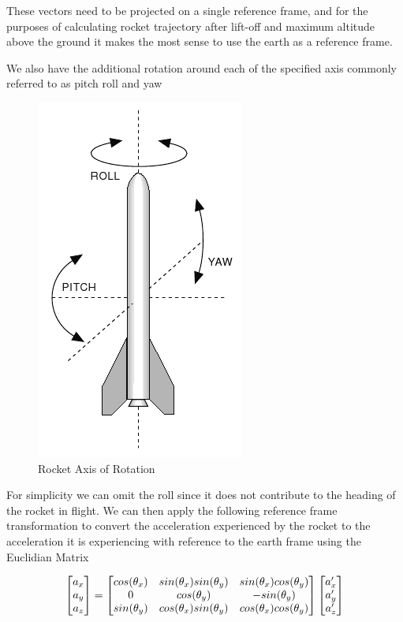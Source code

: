 \documentclass[conference, letterpaper]{IEEEtran}
\begin{document}
These vectors need to be projected on a single reference frame, and for the purposes of calculating
rocket trajectory after lift-off and maximum altitude above the ground it makes the most sense to
use the earth as a reference frame.

We also have the additional rotation around each of the specified axis commonly referred to as
pitch roll and yaw

\begin{figure}[H]
\centering
\includegraphics[scale=0.50]{./pitch_roll_yaw}
\caption{Rocket Axis of Rotation}
\label{fig:pitch_roll_yaw}
\end{figure}

For simplicity we can omit the roll since it does not contribute to the heading of the rocket in flight.
We can then apply the following reference frame transformation to convert the acceleration experienced
by the rocket to the acceleration it is experiencing with reference to the earth frame using the Euclidian Matrix
\cite{mallick_2016}
\vspace{5mm}

\begin{equation}\label{eq:2}
  \begin{bmatrix}a_x \\ a_y \\ a_z
  \end{bmatrix} =

  \vspace{5mm}
  \begin{bmatrix}
    cos(\theta_x) & sin(\theta_x)sin(\theta_y) & sin(\theta_x)cos(\theta_y) \\
    0 & cos(\theta_y) & -sin(\theta_y) \\
    sin(\theta_y) & cos(\theta_x)sin(\theta_y) & cos(\theta_x)cos(\theta_y) \\
  \end{bmatrix}
  \begin{bmatrix} a'_x \\ a'_y \\ a'_z \end{bmatrix}
\end{equation}
\end{document}
